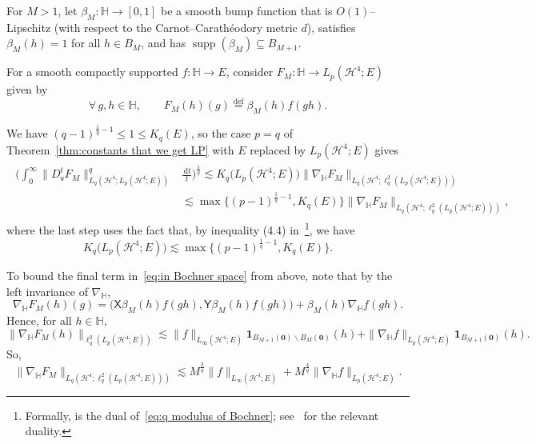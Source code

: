 \documentclass[11pt,reqno]{amsart}
\renewcommand{\H}{\mathbb{H}}
\newcommand{\cH}{\mathcal{H}}
\newcommand{\vv}{\mathsf{v}}
\newcommand{\XX}{\mathsf{X}}
\newcommand{\YY}{\mathsf{Y}}
\newcommand{\ud}[0]{\,\mathrm{d}}
\newcommand{\0}{\mathbf{0}}
\renewcommand{\1}{\mathbf 1}
\newcommand{\from}{\colon}
\renewcommand{\subset}{\subseteq}
\newcommand{\eqdef}{\stackrel{\mathrm{def}}{=}}
\renewcommand{\le}{\leqslant}
\renewcommand{\setminus}{\smallsetminus}
\theoremstyle{remark}
\DeclareMathOperator{\supp}{supp}
\begin{document}
For $M>1$, let $\beta_M\from \H\to [0,1]$ be a smooth bump function that is $O(1)$--Lipschitz (with respect to the Carnot--Carath\'eodory metric $d$), satisfies $\beta_M(h)=1$ for all $h\in B_M$, and has $\supp(\beta_M)\subset B_{M+1}$.

For  a smooth compactly supported $f\from \H\to E$, consider  $F_M\from \H\to L_p(\cH^4;E)$ given by
\begin{equation}\label{eq:def F bump}
\forall\, g,h\in \H,\qquad F_M(h)(g)\eqdef\beta_M(h)f(gh).
\end{equation}

We have $(q-1)^{\frac{1}{q}-1}\le 1 \le K_q(E)$, so the case $p=q$ of Theorem~\ref{thm:constants that we get LP} with $E$ replaced by  $L_p(\cH^4;E)$ gives
\begin{align}\label{eq:in Bochner space}
\begin{split}
\bigg(\int_0^\infty \|D_{\vv}^tF_M\|_{L_q(\cH^4;L_p(\cH^4;E))}^{q}&\frac{\ud t}{t}\bigg)^{\frac1{q}}\lesssim K_q\big(L_p(\cH^4;E)\big)\|\nabla_\H F_M\|_{L_q(\cH^4;\ell_q^2(L_p(\cH^4;E)))}\\
&\!\!\!\!\lesssim \max\Big\{(p-1)^{\frac{1}{q}-1},K_{q}(E)\Big\}\|\nabla_\H F_M\|_{L_q(\cH^4;\ell_q^2(L_p(\cH^4;E)))},
\end{split}
\end{align}
where the last step uses the fact that, by inequality (4.4) in~\cite{Nao14}\footnote{Formally,  \cite[inequality~(4.4)]{Nao14} is the dual of~\eqref{eq:q modulus of Bochner}; see~\cite[Lemma~5]{BCL94} for the relevant duality.}, we have
\begin{equation}\label{eq:q modulus of Bochner}
K_q\big(L_p(\cH^4;E)\big)\lesssim \max\Big\{(p-1)^{\frac{1}{q}-1},K_{q}(E)\Big\}.
\end{equation}

To bound the final term in~\eqref{eq:in Bochner space} from above, note that by the left invariance of $\nabla_\H$,
$$
\nabla_\H F_M(h)(g)=\big(\XX\beta_M(h)f(gh),\YY\beta_M(h)f(gh)\big)+\beta_M(h)\nabla_\H f(gh).
$$
Hence, for all $h\in \H$,
$$
\|\nabla_\H F_M(h)\|_{\ell_q^2(L_p(\cH^4; E))}\lesssim \|f\|_{L_\infty(\cH^4;E)}\1_{B_{M+1}(\0)\setminus B_M(\0)}(h)+ \|\nabla_\H f\|_{L_p(\cH^4;E)}\1_{B_{M+1}(\0)}(h).
$$
So,
\begin{equation}\label{eq:nabla with bump}
\|\nabla_\H F_M\|_{L_q(\cH^4;\ell_q^2(L_p(\cH^4;E)))}\lesssim M^{\frac{3}{q}} \|f\|_{L_\infty(\cH^4;E)}+M^{\frac{4}{q}}\|\nabla_\H f\|_{L_p(\cH^4;E)}.
\end{equation}
\end{document}

